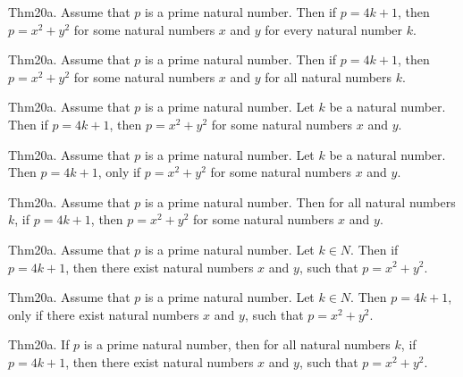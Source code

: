 \documentclass{article}
\begin{document}
Thm20a. Assume that $p$ is a prime natural number. Then if $p = 4 k + 1$, then $p = x ^{ 2}+ y ^{ 2}$ for some natural numbers $x$ and $y$ for every natural number $k$.

Thm20a. Assume that $p$ is a prime natural number. Then if $p = 4 k + 1$, then $p = x ^{ 2}+ y ^{ 2}$ for some natural numbers $x$ and $y$ for all natural numbers $k$.

Thm20a. Assume that $p$ is a prime natural number. Let $k$ be a natural number. Then if $p = 4 k + 1$, then $p = x ^{ 2}+ y ^{ 2}$ for some natural numbers $x$ and $y$.

Thm20a. Assume that $p$ is a prime natural number. Let $k$ be a natural number. Then $p = 4 k + 1$, only if $p = x ^{ 2}+ y ^{ 2}$ for some natural numbers $x$ and $y$.

Thm20a. Assume that $p$ is a prime natural number. Then for all natural numbers $k$, if $p = 4 k + 1$, then $p = x ^{ 2}+ y ^{ 2}$ for some natural numbers $x$ and $y$.

Thm20a. Assume that $p$ is a prime natural number. Let $k \in N$. Then if $p = 4 k + 1$, then there exist natural numbers $x$ and $y$, such that $p = x ^{ 2}+ y ^{ 2}$.

Thm20a. Assume that $p$ is a prime natural number. Let $k \in N$. Then $p = 4 k + 1$, only if there exist natural numbers $x$ and $y$, such that $p = x ^{ 2}+ y ^{ 2}$.

Thm20a. If $p$ is a prime natural number, then for all natural numbers $k$, if $p = 4 k + 1$, then there exist natural numbers $x$ and $y$, such that $p = x ^{ 2}+ y ^{ 2}$.
\end{document}
